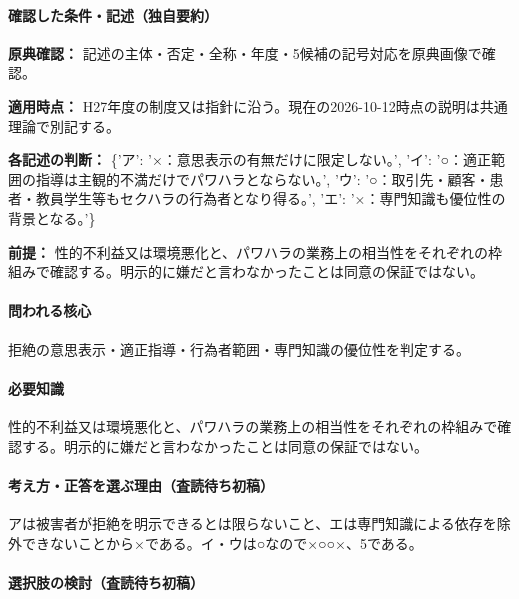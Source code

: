 \paragraph{確認した条件・記述（独自要約）}\mbox{}\par

\noindent\textbf{原典確認：} 記述の主体・否定・全称・年度・5候補の記号対応を原典画像で確認。\par

\noindent\textbf{適用時点：} H27年度の制度又は指針に沿う。現在の2026-10-12時点の説明は共通理論で別記する。\par

\noindent\textbf{各記述の判断：} \{'ア': '×：意思表示の有無だけに限定しない。', 'イ': '○：適正範囲の指導は主観的不満だけでパワハラとならない。', 'ウ': '○：取引先・顧客・患者・教員学生等もセクハラの行為者となり得る。', 'エ': '×：専門知識も優位性の背景となる。'\}\par

\noindent\textbf{前提：} 性的不利益又は環境悪化と、パワハラの業務上の相当性をそれぞれの枠組みで確認する。明示的に嫌だと言わなかったことは同意の保証ではない。\par

\paragraph{問われる核心} 拒絶の意思表示・適正指導・行為者範囲・専門知識の優位性を判定する。

\paragraph{必要知識} 性的不利益又は環境悪化と、パワハラの業務上の相当性をそれぞれの枠組みで確認する。明示的に嫌だと言わなかったことは同意の保証ではない。

\paragraph{考え方・正答を選ぶ理由（査読待ち初稿）} アは被害者が拒絶を明示できるとは限らないこと、エは専門知識による依存を除外できないことから×である。イ・ウは○なので×○○×、5である。

\paragraph{選択肢の検討（査読待ち初稿）}\mbox{}\par

